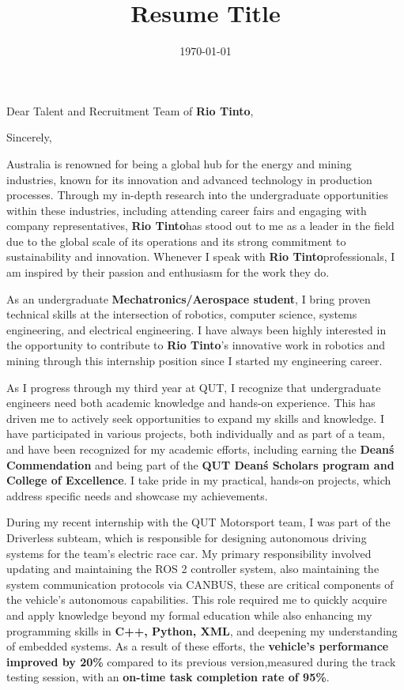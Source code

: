 \documentclass[11pt,a4paper,sans]{moderncv}        %
\title{Resume Title}                               %
\newcommand{\companyname}{\textbf{Rio Tinto}}
\begin{document}
\recipient{\companyname}{Brisbane, QLD 4000}
\date{\today}
\opening{Dear Talent and Recruitment Team of \companyname,}
\closing{Sincerely,}

\makelettertitle
Australia is renowned for being a global hub for the energy and mining industries, 
known for its innovation and advanced technology in production processes. 
Through my in-depth research into the undergraduate opportunities within these industries, 
including attending career fairs and engaging with company representatives, 
\companyname\space has stood out to me as a leader in the field due to the global scale of its operations 
and its strong commitment to sustainability and innovation. Whenever I speak with \companyname\space professionals, 
I am inspired by their passion and enthusiasm for the work they do.

As an undergraduate \textbf{Mechatronics/Aerospace student},
 I bring proven technical skills at the intersection of robotics, computer science, systems engineering,
 and electrical engineering. I have always been highly interested in the opportunity to contribute to \companyname’s 
 innovative work in robotics and mining through this internship position since I started my engineering career.

 As I progress through my third year at QUT, I recognize that undergraduate engineers need both academic knowledge 
 and hands-on experience. This has driven me to actively seek opportunities to expand my skills and knowledge. 
 I have participated in various projects, both individually and as part of a team, and have been recognized for my academic 
 efforts, including earning the \textbf{Dean\'s Commendation} and being part of the \textbf{QUT Dean\'s Scholars program and College of 
 Excellence}. I take pride in my practical, hands-on projects, which address specific needs and showcase my achievements.

During my recent internship with the QUT Motorsport team, I was part of the Driverless subteam, 
which is responsible for designing autonomous driving systems for the team's electric 
race car. My primary responsibility involved updating and maintaining the 
ROS 2 controller system, also maintaining the system communication protocols via CANBUS, 
these are critical components of the vehicle's autonomous capabilities. 
This role required me to quickly acquire and apply knowledge beyond my formal education 
while also enhancing my programming skills in \textbf{C++, Python, XML}, and deepening my 
understanding of embedded systems. As a result of these efforts, the \textbf{vehicle's 
performance improved by 20\%}
compared to its previous version,measured during the track testing session, with an \textbf{on-time task completion rate of 95\%}.
\end{document}
